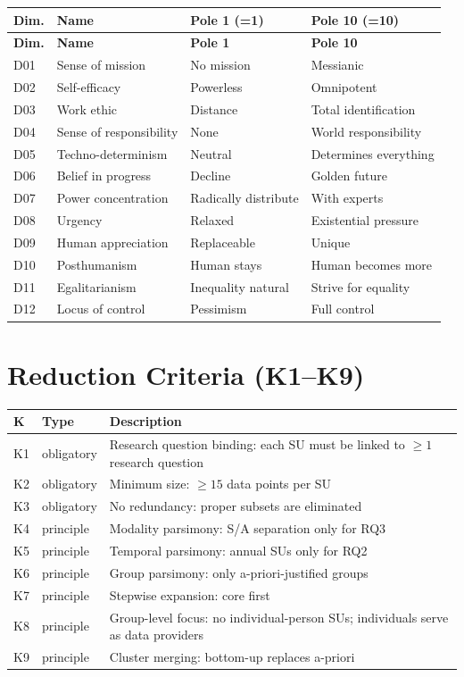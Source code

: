 \documentclass[12pt,a4paper]{article}
\begin{document}
\begin{longtable}{l l l l}
  \toprule
  \textbf{Dim.} & \textbf{Name} & \textbf{Pole 1 (=1)} & \textbf{Pole 10 (=10)} \\
  \midrule
  \endfirsthead
  \toprule
  \textbf{Dim.} & \textbf{Name} & \textbf{Pole 1} & \textbf{Pole 10} \\
  \midrule
  \endhead
  D01 & Sense of mission & No mission & Messianic \\
  D02 & Self-efficacy & Powerless & Omnipotent \\
  D03 & Work ethic & Distance & Total identification \\
  D04 & Sense of responsibility & None & World responsibility \\
  D05 & Techno-determinism & Neutral & Determines everything \\
  D06 & Belief in progress & Decline & Golden future \\
  D07 & Power concentration & Radically distribute & With experts \\
  D08 & Urgency & Relaxed & Existential pressure \\
  D09 & Human appreciation & Replaceable & Unique \\
  D10 & Posthumanism & Human stays & Human becomes more \\
  D11 & Egalitarianism & Inequality natural & Strive for equality \\
  D12 & Locus of control & Pessimism & Full control \\
  \bottomrule
\end{longtable}


\section{Reduction Criteria (K1--K9)}
\label{app:reduktion}

\begin{longtable}{l l p{8cm}}
  \toprule
  \textbf{K} & \textbf{Type} & \textbf{Description} \\
  \midrule
  \endfirsthead
  K1 & obligatory & Research question binding: each SU must be linked to $\geq 1$ research question \\
  K2 & obligatory & Minimum size: $\geq 15$ data points per SU \\
  K3 & obligatory & No redundancy: proper subsets are eliminated \\
  K4 & principle & Modality parsimony: S/A separation only for RQ3 \\
  K5 & principle & Temporal parsimony: annual SUs only for RQ2 \\
  K6 & principle & Group parsimony: only a-priori-justified groups \\
  K7 & principle & Stepwise expansion: core first \\
  K8 & principle & Group-level focus: no individual-person SUs; individuals serve as data providers \\
  K9 & principle & Cluster merging: bottom-up replaces a-priori \\
  \bottomrule
\end{longtable}
\end{document}
